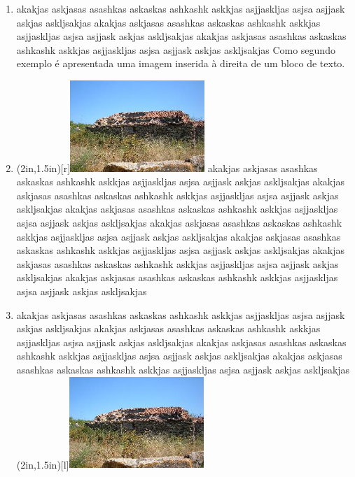 \documentclass[a4paper,12pt]{article}
\begin{document}
%
%
%
%

\begin{enumerate}
\item akakjas askjasas asashkas askaskas ashkashk askkjas  asjjaskljas asjsa asjjask askjas askljsakjas
 akakjas askjasas asashkas askaskas ashkashk askkjas  asjjaskljas asjsa asjjask askjas askljsakjas
 akakjas askjasas asashkas askaskas ashkashk askkjas  asjjaskljas asjsa asjjask askjas askljsakjas
Como segundo exemplo é apresentada uma imagem inserida à direita de
um bloco de texto.
\item
    \parpic(2in,1.5in)[r]{\includegraphics[width=2in]{dscf1683b_v1.jpg}}
    akakjas askjasas asashkas askaskas ashkashk askkjas  asjjaskljas asjsa asjjask askjas askljsakjas
    akakjas askjasas asashkas askaskas ashkashk askkjas  asjjaskljas asjsa asjjask askjas askljsakjas
   akakjas askjasas asashkas askaskas ashkashk askkjas  asjjaskljas asjsa asjjask askjas askljsakjas
 akakjas askjasas asashkas askaskas ashkashk askkjas  asjjaskljas asjsa asjjask askjas askljsakjas
   akakjas askjasas asashkas askaskas ashkashk askkjas  asjjaskljas asjsa asjjask askjas askljsakjas
 akakjas askjasas asashkas askaskas ashkashk askkjas  asjjaskljas asjsa asjjask askjas askljsakjas
   akakjas askjasas asashkas askaskas ashkashk askkjas  asjjaskljas asjsa asjjask askjas askljsakjas
\item akakjas askjasas asashkas askaskas ashkashk askkjas  asjjaskljas asjsa asjjask askjas askljsakjas
 akakjas askjasas asashkas askaskas ashkashk askkjas  asjjaskljas asjsa asjjask askjas askljsakjas
   akakjas askjasas asashkas askaskas ashkashk askkjas  asjjaskljas asjsa asjjask askjas askljsakjas
   akakjas askjasas asashkas askaskas ashkashk askkjas  asjjaskljas asjsa asjjask askjas askljsakjas
    \parpic(2in,1.5in)[l]{\includegraphics[width=2in]{dscf1683b_v1.jpg}}

\end{enumerate}
\end{document}
